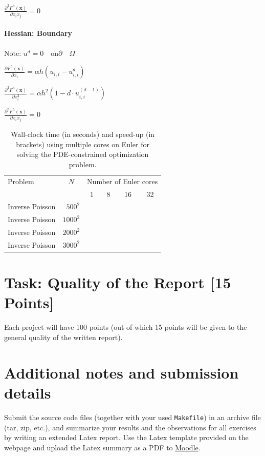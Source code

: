 \documentclass[unicode,11pt,a4paper,oneside,numbers=endperiod,openany]{scrartcl}
\begin{document}
$\frac{\partial^2 F^h(\mathbf{x})}{\partial x_{i}x_{j}}=0$

\paragraph{Hessian: Boundary} Note: $u^d=0 \quad \text{on} \partial \quad \Omega$

$\frac{\partial F^h(\mathbf{x})}{\partial x_{i}} 
= \alpha h (u_{i,i} - u_{i,i}^d)$


$\frac{\partial^2 F^h(\mathbf{x})}{\partial x_{i}^2} 
= \alpha h^2 (1 - d\cdot u_{i,i}^{(d-1)})$

$\frac{\partial^2 F^h(\mathbf{x})}{\partial x_{i}x_{j}} = 0$


\begin{table}[h]
  \caption{Wall-clock time (in seconds) and speed-up (in brackets) using multiple cores on Euler for solving the PDE-constrained optimization problem.}
	\centering
	
	\medskip
	
	\begin{tabular}{l|r||r|r|r|r}\hline\hline
		Problem & \multicolumn{1}{c||}{$N$} &  \multicolumn{4}{c}{Number of Euler cores} \\
		&       & \multicolumn{1}{c|}{1} & \multicolumn{1}{c|}{8} & \multicolumn{1}{c|}{16} & \multicolumn{1}{c}{32} \\
		\hline\hline
		{ Inverse Poisson} & $500^2$  &    \phantom{222222}        &    \phantom{222222}      & \phantom{222222}         &      \phantom{222222} \\
		{ Inverse  Poisson} & $1000^2$ &            &          &          &       \\
		{ Inverse Poisson} & $2000^2$ &            &          &          &       \\
		{ Inverse Poisson} & $3000^2$ &            &          &          &       \\\hline \hline
	\end{tabular}
	
	\label{tab:PDEparallel}
\end{table}

\section{Task:  Quality of the Report [15 Points]}
Each project will have 100 points (out of  which 15 points will be given to the general quality of the written report).


\section*{Additional notes and submission details}
Submit the source code files (together with your used \texttt{Makefile}) in
an archive file (tar, zip, etc.), and summarize your results and the
observations for all exercises by writing an extended Latex report.
Use the Latex template provided on the webpage and upload the Latex summary
as a PDF to \href{https://moodle-app2.let.ethz.ch/course/view.php?id=14316}{Moodle}.
\end{document}
